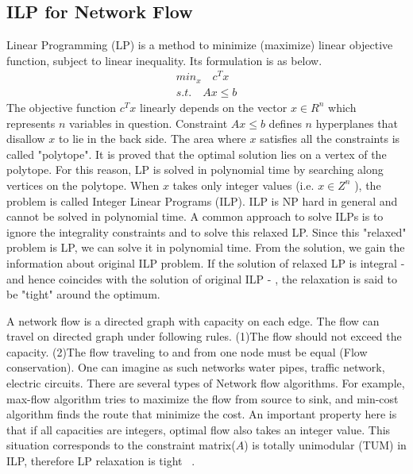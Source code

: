 \documentclass[10pt,twocolumn,letterpaper]{article}
\begin{document}
\subsection{ILP for Network Flow}
\label{ILP formulation}

Linear Programming (LP) is a method to minimize (maximize) linear objective function, subject to linear inequality. Its formulation is as below.
\begin{align}
min_{x} \quad c^{T}x \\
s.t. \quad Ax \leq b
\end{align}
The objective function \(c^{T}x\) linearly depends on the vector \(x \in R^{n}\) which represents $n$ variables in question. Constraint \(Ax \leq b\) defines $n$ hyperplanes that disallow $x$ to lie in the back side. The area where $x$ satisfies all the constraints is called "polytope". It is proved that the optimal solution lies on a vertex of the polytope. For this reason, LP is solved in polynomial time by searching along vertices on the polytope.
When $x$ takes only integer values (i.e. \(x \in Z^{n}\) ), the problem is called Integer Linear Programs (ILP). ILP is NP hard in general and cannot be solved in polynomial time. 
A common approach to solve ILPs is to ignore the integrality constraints and to solve this relaxed LP. Since this "relaxed" problem is LP, we can solve it in polynomial time. From the solution, we gain the information about original ILP problem.
If the solution of relaxed LP is integral - and hence coincides with the solution of original ILP - , the relaxation is said to be "tight" around the optimum.

A network flow is a directed graph with capacity on each edge. The flow can travel on directed graph under following rules. (1)The flow should not exceed the capacity. (2)The flow traveling to and from one node must be equal (Flow conservation). One can imagine as such networks water pipes, traffic network, electric circuits. There are several types of Network flow algorithms. For example, max-flow algorithm tries to maximize the flow from source to sink, and min-cost algorithm finds the route that minimize the cost. An important property here is that if all capacities are integers, optimal flow also takes an integer value. This situation corresponds to the constraint matrix($A$) is totally unimodular (TUM) in ILP, therefore LP relaxation is tight ~\cite{Bertsekas}.
\end{document}
